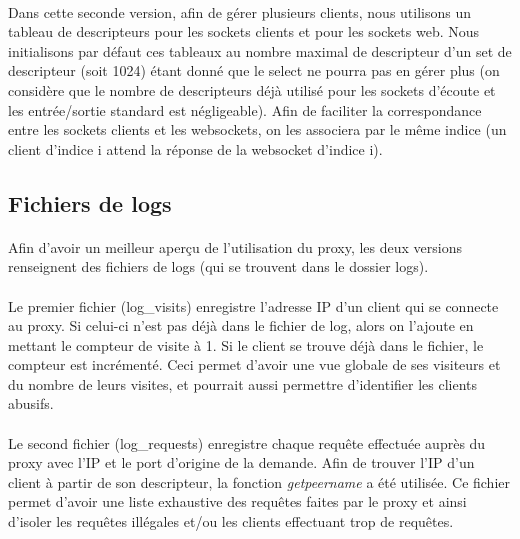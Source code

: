 \paragraph{}
Dans cette seconde version, afin de gérer plusieurs clients, nous utilisons un tableau de descripteurs pour les sockets clients et pour les sockets web. Nous initialisons par défaut ces tableaux au nombre maximal de descripteur d'un set de descripteur (soit 1024) étant donné que le select ne pourra pas en gérer plus (on considère que le nombre de descripteurs déjà utilisé pour les sockets d'écoute et les entrée/sortie standard est négligeable). \linebreak
Afin de faciliter la correspondance entre les sockets clients et les websockets, on les associera par le même indice (un client d'indice i attend la réponse de la websocket d'indice i).

\subsection{Fichiers de logs}
\paragraph{}
Afin d'avoir un meilleur aperçu de l'utilisation du proxy, les deux versions renseignent des fichiers de logs (qui se trouvent dans le dossier logs). 
\paragraph{}
Le premier fichier (log\_visits) enregistre l'adresse IP d'un client qui se connecte au proxy. Si celui-ci n'est pas déjà dans le fichier de log, alors on l'ajoute en mettant le compteur de visite à 1. Si le client se trouve déjà dans le fichier, le compteur est incrémenté. Ceci permet d'avoir une vue globale de ses visiteurs et du nombre de leurs visites, et pourrait aussi permettre d'identifier les clients abusifs. 
\paragraph{}
Le second fichier (log\_requests) enregistre chaque requête effectuée auprès du proxy avec l'IP et le port d'origine de la demande. Afin de trouver l'IP d'un client à partir de son descripteur, la fonction \textit{getpeername} a été utilisée. Ce fichier permet d'avoir une liste exhaustive des requêtes faites par le proxy et ainsi d'isoler les requêtes illégales et/ou les clients effectuant trop de requêtes.

